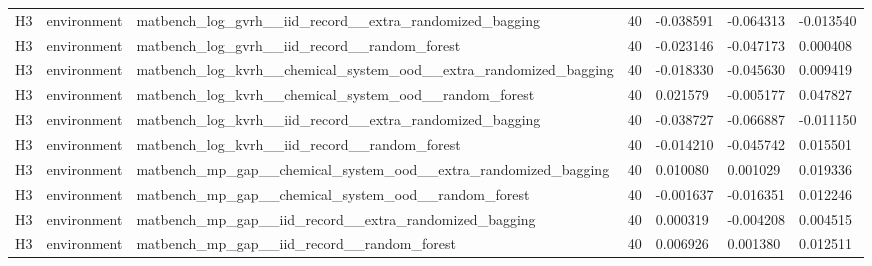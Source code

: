 \documentclass[10pt]{article}
\begin{document}
\begin{landscape}
\begin{longtable}{L{.35in}L{.6in}L{3.55in}L{.4in}L{.88in}L{.88in}L{.88in}}
H3 & environment & matbench\_\allowbreak{}log\_\allowbreak{}gvrh\_\allowbreak{}\_\allowbreak{}iid\_\allowbreak{}record\_\allowbreak{}\_\allowbreak{}extra\_\allowbreak{}randomized\_\allowbreak{}bagging & 40 & -0.038591 & -0.064313 & -0.013540\\
H3 & environment & matbench\_\allowbreak{}log\_\allowbreak{}gvrh\_\allowbreak{}\_\allowbreak{}iid\_\allowbreak{}record\_\allowbreak{}\_\allowbreak{}random\_\allowbreak{}forest & 40 & -0.023146 & -0.047173 & 0.000408\\
H3 & environment & matbench\_\allowbreak{}log\_\allowbreak{}kvrh\_\allowbreak{}\_\allowbreak{}chemical\_\allowbreak{}system\_\allowbreak{}ood\_\allowbreak{}\_\allowbreak{}extra\_\allowbreak{}randomized\_\allowbreak{}bagging & 40 & -0.018330 & -0.045630 & 0.009419\\
H3 & environment & matbench\_\allowbreak{}log\_\allowbreak{}kvrh\_\allowbreak{}\_\allowbreak{}chemical\_\allowbreak{}system\_\allowbreak{}ood\_\allowbreak{}\_\allowbreak{}random\_\allowbreak{}forest & 40 & 0.021579 & -0.005177 & 0.047827\\
H3 & environment & matbench\_\allowbreak{}log\_\allowbreak{}kvrh\_\allowbreak{}\_\allowbreak{}iid\_\allowbreak{}record\_\allowbreak{}\_\allowbreak{}extra\_\allowbreak{}randomized\_\allowbreak{}bagging & 40 & -0.038727 & -0.066887 & -0.011150\\
H3 & environment & matbench\_\allowbreak{}log\_\allowbreak{}kvrh\_\allowbreak{}\_\allowbreak{}iid\_\allowbreak{}record\_\allowbreak{}\_\allowbreak{}random\_\allowbreak{}forest & 40 & -0.014210 & -0.045742 & 0.015501\\
H3 & environment & matbench\_\allowbreak{}mp\_\allowbreak{}gap\_\allowbreak{}\_\allowbreak{}chemical\_\allowbreak{}system\_\allowbreak{}ood\_\allowbreak{}\_\allowbreak{}extra\_\allowbreak{}randomized\_\allowbreak{}bagging & 40 & 0.010080 & 0.001029 & 0.019336\\
H3 & environment & matbench\_\allowbreak{}mp\_\allowbreak{}gap\_\allowbreak{}\_\allowbreak{}chemical\_\allowbreak{}system\_\allowbreak{}ood\_\allowbreak{}\_\allowbreak{}random\_\allowbreak{}forest & 40 & -0.001637 & -0.016351 & 0.012246\\
H3 & environment & matbench\_\allowbreak{}mp\_\allowbreak{}gap\_\allowbreak{}\_\allowbreak{}iid\_\allowbreak{}record\_\allowbreak{}\_\allowbreak{}extra\_\allowbreak{}randomized\_\allowbreak{}bagging & 40 & 0.000319 & -0.004208 & 0.004515\\
H3 & environment & matbench\_\allowbreak{}mp\_\allowbreak{}gap\_\allowbreak{}\_\allowbreak{}iid\_\allowbreak{}record\_\allowbreak{}\_\allowbreak{}random\_\allowbreak{}forest & 40 & 0.006926 & 0.001380 & 0.012511\\

\end{longtable}
\end{landscape}
\end{document}
